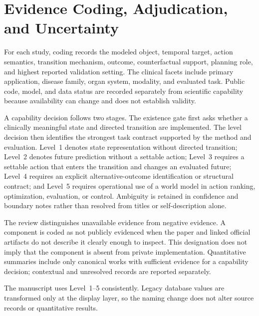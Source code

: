 \section{Evidence Coding, Adjudication, and Uncertainty}
\label{app:coding}

For each study, coding records the modeled object, temporal target, action semantics, transition mechanism, outcome, counterfactual support, planning role, and highest reported validation setting. The clinical facets include primary application, disease family, organ system, modality, and evaluated task. Public code, model, and data status are recorded separately from scientific capability because availability can change and does not establish validity.

A capability decision follows two stages. The existence gate first asks whether a clinically meaningful state and directed transition are implemented. The level decision then identifies the strongest task contract supported by the method and evaluation. Level~1 denotes state representation without directed transition; Level~2 denotes future prediction without a settable action; Level~3 requires a settable action that enters the transition and changes an evaluated future; Level~4 requires an explicit alternative-outcome identification or structural contract; and Level~5 requires operational use of a world model in action ranking, optimization, evaluation, or control. Ambiguity is retained in confidence and boundary notes rather than resolved from titles or self-description alone.

The review distinguishes unavailable evidence from negative evidence. A component is coded as not publicly evidenced when the paper and linked official artifacts do not describe it clearly enough to inspect. This designation does not imply that the component is absent from private implementation. Quantitative summaries include only canonical works with sufficient evidence for a capability decision; contextual and unresolved records are reported separately.

The manuscript uses Level~1--5 consistently. Legacy database values are transformed only at the display layer, so the naming change does not alter source records or quantitative results.




